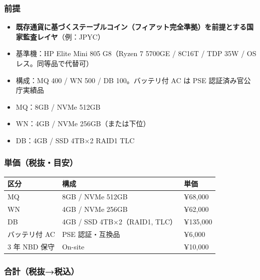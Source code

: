 \documentclass[
]{article}
\providecommand{\tightlist}{%
  \setlength{\itemsep}{0pt}\setlength{\parskip}{0pt}}
\begin{document}
\subsubsection{前提}\label{ux524dux63d0-1}

\begin{itemize}
\tightlist
\item
  \textbf{既存通貨に基づくステーブルコイン（フィアット完全準拠）を前提とする国家監査レイヤ}（例：JPYC）\\
\item
  基準機：HP Elite Mini 805 G8（Ryzen 7 5700GE / 8C16T / TDP 35W / OS
  レス。同等品で代替可）\\
\item
  構成：MQ 400 / WN 500 / DB 100。バッテリ付 AC は PSE
  認証済み官公庁実績品\\
\item
  MQ：8GB / NVMe 512GB\\
\item
  WN：4GB / NVMe 256GB（または下位）\\
\item
  DB：4GB / SSD 4TB×2 RAID1 TLC
\end{itemize}

\subsubsection{単価（税抜・目安）}\label{ux5358ux4fa1ux7a0eux629cux76eeux5b89}

\begin{longtable}[]{@{}lll@{}}
\toprule\noalign{}
区分 & 構成 & 単価 \\
\midrule\noalign{}
\endhead
\bottomrule\noalign{}
\endlastfoot
MQ & 8GB / NVMe 512GB & ¥68,000 \\
WN & 4GB / NVMe 256GB & ¥62,000 \\
DB & 4GB / SSD 4TB×2（RAID1, TLC） & ¥135,000 \\
バッテリ付 AC & PSE 認証・互換品 & ¥6,000 \\
3 年 NBD 保守 & On-site & ¥10,000 \\
\end{longtable}

\subsubsection{合計（税抜→税込）}\label{ux5408ux8a08ux7a0eux629cux7a0eux8fbc}
\end{document}
